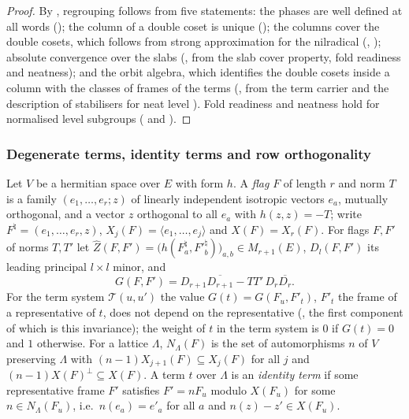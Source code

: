 \begin{proof}
By , regrouping follows from five statements: the phases
are well defined at all words (); the column of a
double coset is unique (); the columns cover the double cosets,
which follows from strong approximation for the nilradical (,
); absolute convergence over the slabs
(, from the slab cover property, fold readiness and neatness); and the
orbit algebra, which identifies the double cosets inside a column with the classes of frames of the terms
(, from the term carrier
 and the description of stabilisers for neat level
). Fold readiness and neatness hold for normalised level
subgroups ( and ).
\end{proof}

\subsubsection{Degenerate terms, identity terms and row orthogonality}

\begin{definition}\label{pf:sh-siegel:weightdef}
Let $V$ be a hermitian space over $E$ with form $h$. A \emph{flag} $F$ of length $r$ and norm $T$ is a family
$(e_1,\dots,e_r;z)$ of linearly independent isotropic vectors $e_a$, mutually orthogonal, and a vector $z$ orthogonal to
all $e_a$ with $h(z,z)=-T$; write $F^\natural=(e_1,\dots,e_r,z)$, $X_j(F)=\langle e_1,\dots,e_j\rangle$ and
$X(F)=X_r(F)$. For flags $F,F'$ of norms $T,T'$ let $\widehat Z(F,F')=\bigl(h(F^\natural_a,F'^\natural_b)\bigr)_{a,b}\in
M_{r+1}(E)$, $D_l(F,F')$ its leading principal $l\times l$ minor, and
\[
G(F,F')=D_{r+1}\overline{D_{r+1}}-TT'\,D_r\overline{D_r} .
\]
For the term system $\mathcal T(u,u')$ the value $G(t)=G(F_u,F'_t)$, $F'_t$ the frame of a representative of $t$, does not
depend on the representative (, the first component of which is this
invariance); the weight of $t$ in the term system is $0$ if $G(t)=0$ and $1$ otherwise. For a lattice $\Lambda$, $N_\Lambda(F)$
is the set of automorphisms $n$ of $V$ preserving $\Lambda$ with $(n-1)X_{j+1}(F)\subseteq X_j(F)$ for all $j$ and
$(n-1)X(F)^\perp\subseteq X(F)$. A term $t$ over $\Lambda$ is an \emph{identity term} if some representative frame $F'$
satisfies $F'=nF_u$ modulo $X(F_u)$ for some $n\in N_\Lambda(F_u)$, i.e.\ $n(e_a)=e'_a$ for all $a$ and $n(z)-z'\in X(F_u)$.
\ 
\end{definition}

